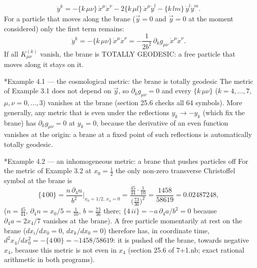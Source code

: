 \documentclass[10pt,a4paper]{article}
\makeatletter
\renewcommand\subsubsection{\@startsection{subsubsection}{3}{\z@}{-3.25ex\@plus -1ex \@minus -.2ex}{1.5ex \@plus .2ex}{\normalfont\normalsize\bfseries\raggedright}}
\makeatother
\begin{document}
\begin{equation*}
\ddot y^k=-\{k\,\mu\nu\}\,\dot x^\mu\dot x^\nu-2\{k\,\mu l\}\,\dot x^\mu\dot y^l-\{k\,lm\}\,\dot y^l\dot y^m .
\end{equation*}
For a particle that moves along the brane ($\vec y=0$ and $\dot{\vec y}=0$ at the moment considered) only the first term remains:
\begin{equation*}
\ddot y^k=-\{k\,\mu\nu\}\,\dot x^\mu\dot x^\nu=-\frac1{2b^2}\,\partial_kg_{\mu\nu}\,\dot x^\mu\dot x^\nu .
\end{equation*}
If all $K^{(k)}_{\mu\nu}$ vanish, the brane is TOTALLY GEODESIC: a free particle that moves along it stays on it.

\subsubsection*{Example 4.1 — the cosmological metric: the brane is totally geodesic}
The metric of Example 3.1 does not depend on $\vec y$, so $\partial_kg_{\mu\nu}=0$ and every $\{k\,\mu\nu\}$ ($k=4,\dots,7$, $\mu,\nu=0,\dots,3$) vanishes at the brane (section 25.6 checks all 64 symbols). More generally, any metric that is even under the reflections $y_k\to-y_k$ (which fix the brane) has $\partial_kg_{\mu\nu}=0$ at $y_k=0$, because the derivative of an even function vanishes at the origin: a brane at a fixed point of such reflections is automatically totally geodesic.

\subsubsection*{Example 4.2 — an inhomogeneous metric: a brane that pushes particles off}
For the metric of Example 3.2 at $x_0=\frac12$ the only non-zero transverse Christoffel symbol at the brane is
\begin{equation*}
\{4\,00\}=\frac{n\,\partial_4n}{b^2}\Big|_{x_0=1/2,\,x_4=0}=\frac{\frac{45}{44}\cdot\frac1{10}}{\big(\frac{73}{36}\big)^2}=\frac{1458}{58619}=0.02487248,
\end{equation*}
($n=\frac{45}{44}$, $\partial_4n=x_0/5=\frac1{10}$, $b=\frac{73}{36}$ there; $\{4\,ii\}=-a\,\partial_4a/b^2=0$ because $\partial_4a=2x_4/7$ vanishes at the brane). A free particle momentarily at rest on the brane ($dx_i/dx_0=0$, $dx_k/dx_0=0$) therefore has, in coordinate time, $d^2x_4/dx_0^2=-\{4\,00\}=-1458/58619$: it is pushed off the brane, towards negative $x_4$, because this metric is not even in $x_4$ (section 25.6 of 7+1.nb; exact rational arithmetic in both programs).
\end{document}
